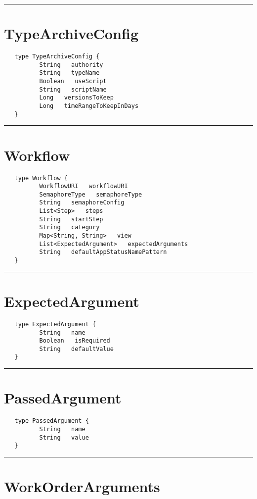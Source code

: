 \rule{15cm}{2pt}
\section{TypeArchiveConfig}
\label{type:TypeArchiveConfig}

\begin{verbatim}
   type TypeArchiveConfig {
          String   authority
          String   typeName
          Boolean   useScript
          String   scriptName
          Long   versionsToKeep
          Long   timeRangeToKeepInDays
   }
\end{verbatim}

\rule{15cm}{2pt}
\section{Workflow}
\label{type:Workflow}

\begin{verbatim}
   type Workflow {
          WorkflowURI   workflowURI
          SemaphoreType   semaphoreType
          String   semaphoreConfig
          List<Step>   steps
          String   startStep
          String   category
          Map<String, String>   view
          List<ExpectedArgument>   expectedArguments
          String   defaultAppStatusNamePattern
   }
\end{verbatim}

\rule{15cm}{2pt}
\section{ExpectedArgument}
\label{type:ExpectedArgument}

\begin{verbatim}
   type ExpectedArgument {
          String   name
          Boolean   isRequired
          String   defaultValue
   }
\end{verbatim}

\rule{15cm}{2pt}
\section{PassedArgument}
\label{type:PassedArgument}

\begin{verbatim}
   type PassedArgument {
          String   name
          String   value
   }
\end{verbatim}

\rule{15cm}{2pt}
\section{WorkOrderArguments}
\label{type:WorkOrderArguments}

